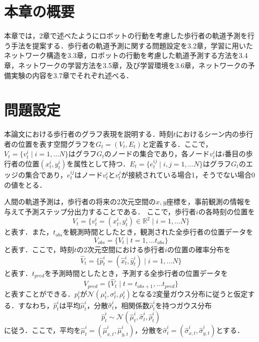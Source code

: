 
\section{本章の概要}

本章では，2章で述べたようにロボットの行動を考慮した歩行者の軌道予測を行う手法を提案する．歩行者の軌道予測に関する問題設定を3.2章，学習に用いたネットワーク構造を3.3章，ロボットの行動を考慮した軌道予測する方法を3.4章，ネットワークの学習方法を3.5章，及び学習環境を3.6章，ネットワークの予備実験の内容を3.7章でそれぞれ述べる．



\section{問題設定}
本論文における歩行者のグラフ表現を説明する．時刻$t$におけるシーン内の歩行者の位置を表す空間グラフを$G_t = (V_t, E_t)$と定義する．ここで，$V_t = \{ v^i_t \mid i = 1, \dots N \}$はグラフ$G_t$のノードの集合であり，各ノード$v^i_t$は$i$番目の歩行者の位置$(x^i_t, y^i_t)$を属性として持つ．$E_t = \{ e^{ij}_t \mid i, j = 1, \dots N \}$はグラフ$G_t$のエッジの集合であり，$e^{ij}_t$はノード$v^i_t$と$v^j_t$が接続されている場合1，そうでない場合0の値をとる．

人間の軌道予測は，歩行者の将来の2次元空間の$x,y$座標を，事前観測の情報を与えて予測ステップ分出力することである．
ここで，歩行者$i$の各時刻の位置を
\begin{equation}
  V_t = \{ v^i_t = (x^i_t, y^i_t) \in \mathbb{R}^2 \mid i = 1, \dots N \}
\end{equation}
と表す．また，$t_{obs}$を観測時間としたとき，観測された全歩行者の位置データを
\begin{equation}
  V_{obs} = \{ V_t \mid t = 1, \dots t_{obs} \}  
\end{equation}
と表す．ここで，時刻$t$の2次元空間における歩行者$i$の位置の確率分布を
\begin{equation}
  \hat{V}_t = \{ \hat{p}^i_t = (\hat{x}^i_t, \hat{y}^i_t) \mid i = 1, \dots N \} \label{hat-pos}
\end{equation}
と表す．$t_{pred}$を予測時間としたとき，予測する全歩行者の位置データを
\begin{equation}
  V_{pred} = \{ \hat{V}_t \mid t = t_{obs + 1}, \dots t_{pred} \}
\end{equation}
と表すことができる．$p^i_t$が$\mathcal{N}(\mu^i_t, \sigma^i_t, \rho^i_t)$となる2変量ガウス分布に従うと仮定する．すなわち，$\hat{p}^i_t$は平均$\hat{\mu}^i_t$，分散$\hat{\sigma}^i_t$，相関係数$\hat{\rho}^i_t$を持つガウス分布
\begin{equation}
  \hat{p}^i_t \sim \mathcal{N}(\hat{\mu}^i_t, \hat{\sigma}^i_t, \hat{\rho}^i_t)
\end{equation}
に従う．ここで，平均を$\hat{\mu}^i_t = (\hat{\mu}^i_{x, t}, \hat{\mu}^i_{y, t})$，分散を$\hat{\sigma}^i_t = (\hat{\sigma}^i_{x, t}, \hat{\sigma}^i_{y, t})$とする．


